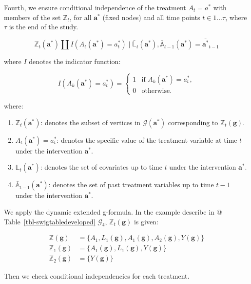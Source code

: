 \documentclass[
  single column]{article}
\providecommand{\tightlist}{%
  \setlength{\itemsep}{0pt}\setlength{\parskip}{0pt}}\usepackage{longtable,booktabs,array}
\begin{document}
Fourth, we ensure conditional independence of the treatment
\(A_t = a^*\) with members of the set \(\mathbb{Z}_t\), for all
\(\mathbf{a}^*\) (fixed nodes) and all time points \(t \in 1...\tau\),
where \(\tau\) is the end of the study.

\[
\mathbb{Z}_t(\mathbf{a}^*) \coprod I(A_t(\mathbf{a}^*) = a^*_t) \mid \bar{\mathbb{L}}_t(\mathbf{a}^*), \bar{\mathbb{A}}_{t-1}(\mathbf{a}^*) = \bar{\mathbf{a}^*}_{t-1}
\]

where \(I\) denotes the indicator function:

\[
I(A_k(\mathbf{a}^*) = a^*_t) = 
\begin{cases} 
1 & \text{if } A_k(\mathbf{a}^*) = a^*_t, \\
0 & \text{otherwise}.
\end{cases}
\]

where:

\begin{enumerate}
\def\labelenumi{\arabic{enumi}.}
\tightlist
\item
  \textbf{\(\mathbb{Z}_t(\mathbf{a}^*)\)}: denotes the subset of
  vertices in \(\mathcal{G}(\mathbf{a}^*)\) corresponding to
  \(\mathbb{Z}_t(\mathbf{g})\).
\item
  \textbf{\(A_t(\mathbf{a}^*) = a^*_t\)}: denotes the specific value of
  the treatment variable at time \(t\) under the intervention
  \(\mathbf{a}^*\).
\item
  \textbf{\(\bar{\mathbb{L}}_t(\mathbf{a}^*)\)}: denotes the set of
  covariates up to time \(t\) under the intervention \(\mathbf{a}^*\).
\item
  \textbf{\(\bar{\mathbb{A}}_{t-1}(\mathbf{a}^*)\)}: denotes the set of
  past treatment variables up to time \(t-1\) under the intervention
  \(\mathbf{a}^*\).
\end{enumerate}

We apply the dynamic extended g-formula. In the example describe in @
Table~\ref{tbl-swigtabledeveloped} \(\mathcal{G}_4\),
\(\mathbb{Z}_t(\mathbf{g})\) is given:

\[
\begin{aligned}
\mathbb{Z}(\mathbf{g}) &= \{A_1, L_1(\mathbf{g}), A_1(\mathbf{g}), A_2(\mathbf{g}), Y(\mathbf{g})\} \\
\mathbb{Z}_1(\mathbf{g}) &= \{A_1(\mathbf{g}), L_1(\mathbf{g}), Y(\mathbf{g})\} \\
\mathbb{Z}_2(\mathbf{g}) &= \{Y(\mathbf{g})\}
\end{aligned}
\]

Then we check conditional independencies for each treatment.
\end{document}
